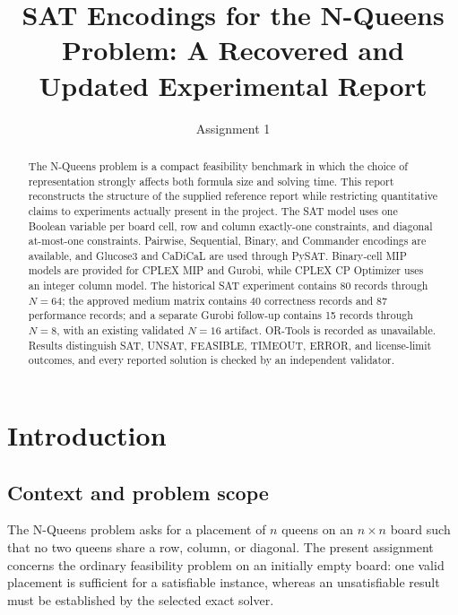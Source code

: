 \documentclass[a4paper,fleqn]{cas-sc}
\begin{document}
\title [mode = title]{SAT Encodings for the N-Queens Problem: A Recovered and Updated Experimental Report}
\author[1]{Assignment 1}

\begin{abstract}
The N-Queens problem is a compact feasibility benchmark in which the choice of
representation strongly affects both formula size and solving time. This report
reconstructs the structure of the supplied reference report while restricting
quantitative claims to experiments actually present in the project. The SAT
model uses one Boolean variable per board cell, row and column exactly-one
constraints, and diagonal at-most-one constraints. Pairwise, Sequential,
Binary, and Commander encodings are available, and Glucose3 and CaDiCaL are
used through PySAT. Binary-cell MIP models are provided for CPLEX MIP and
Gurobi, while CPLEX CP Optimizer uses an integer column model. The historical
SAT experiment contains 80 records through $N=64$; the approved medium matrix
contains 40 correctness records and 87 performance records; and a separate
Gurobi follow-up contains 15 records through $N=8$, with an existing validated
$N=16$ artifact. OR-Tools is recorded as unavailable. Results distinguish
SAT, UNSAT, FEASIBLE, TIMEOUT, ERROR, and license-limit outcomes, and every
reported solution is checked by an independent validator.
\end{abstract}

\maketitle

\section{Introduction}

\subsection{Context and problem scope}
The N-Queens problem asks for a placement of $n$ queens on an $n\times n$
board such that no two queens share a row, column, or diagonal. The present
assignment concerns the ordinary feasibility problem on an initially empty
board: one valid placement is sufficient for a satisfiable instance, whereas
an unsatisfiable result must be established by the selected exact solver.
\end{document}
